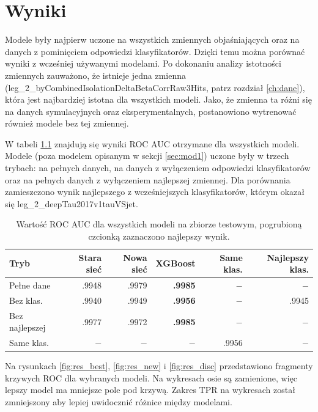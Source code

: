 \documentclass{pracalicmgr}
\begin{document}
    \chapter{Wyniki}
	Modele były najpierw uczone na wszystkich zmiennych objaśniających oraz na danych z pominięciem odpowiedzi klasyfikatorów. Dzięki temu można porównać wyniki z wcześniej używanymi modelami. Po dokonaniu analizy istotności zmiennych zauważono, że istnieje jedna zmienna (leg\_2\_byCombinedIsolationDeltaBetaCorrRaw3Hits, patrz rozdział \ref{ch:dane}), która jest najbardziej istotna dla wszystkich modeli. Jako, że zmienna ta różni się na danych symulacyjnych oraz eksperymentalnych, postanowiono wytrenować również modele bez tej zmiennej.
    
	W tabeli \ref{tab:wyniki} znajdują się wyniki ROC AUC otrzymane dla wszystkich modeli. Modele (poza modelem opisanym w sekcji \ref{sec:mod1}) uczone były w trzech trybach: na pełnych danych, na danych z wyłączeniem odpowiedzi klasyfikatorów oraz na pełnych danych z wyłączeniem najlepszej zmiennej. Dla porównania zamieszczono wynik najlepszego z wcześniejszych klasyfikatorów, którym okazał się leg\_2\_deepTau2017v1tauVSjet. 
	
	\begin{table}[H]
	\centering
	\begin{tabular}{lrrrrr}
	\toprule
	Tryb & Stara sieć & Nowa sieć & XGBoost & Same klas. & Najlepszy klas. \\
	\midrule
	Pełne dane & .9948 & .9979 & \textbf{.9985} & $-$ & $-$ \\
	Bez klas. & .9940 & .9949 & \textbf{.9956} & $-$ & .9945 \\
	Bez najlepszej & .9977 & .9972 & \textbf{.9985} & $-$ & $-$ \\
	Same klas. & $-$ & $-$ & $-$ & .9956 & $-$  \\
	\bottomrule
	\end{tabular}
	\caption{Wartość ROC AUC dla wszystkich modeli na zbiorze testowym, pogrubioną czcionką zaznaczono najlepszy wynik.}
	\label{tab:wyniki}
	\end{table}
	
	Na rysunkach \ref{fig:res_best}, \ref{fig:res_new} i \ref{fig:res_disc} przedstawiono fragmenty krzywych ROC dla wybranych modeli. Na wykresach osie są zamienione, więc lepszy model ma mniejsze pole pod krzywą. Zakres TPR na wykresach został zmniejszony aby lepiej uwidocznić różnice między modelami.
	
\end{document}
